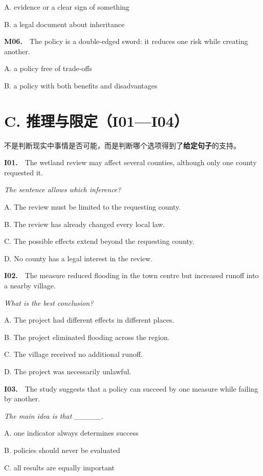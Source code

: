 \documentclass[a4paper,11pt,openany]{report}
\begin{document}
A. evidence or a clear sign of something

B. a legal document about inheritance

\textbf{M06.}　The policy is a double-edged sword: it reduces one risk while creating another.

A. a policy free of trade-offs

B. a policy with both benefits and disadvantages

\section{C. 推理与限定（I01---I04）}\label{c.-ux63a8ux7406ux4e0eux9650ux5b9ai01i04}

不是判断现实中事情是否可能，而是判断哪个选项得到了\textbf{给定句子}的支持。

\textbf{I01.}　The wetland review may affect several counties, although only one county requested it.

\emph{The sentence allows which inference?}

A. The review must be limited to the requesting county.

B. The review has already changed every local law.

C. The possible effects extend beyond the requesting county.

D. No county has a legal interest in the review.

\textbf{I02.}　The measure reduced flooding in the town centre but increased runoff into a nearby village.

\emph{What is the best conclusion?}

A. The project had different effects in different places.

B. The project eliminated flooding across the region.

C. The village received no additional runoff.

D. The project was necessarily unlawful.

\textbf{I03.}　The study suggests that a policy can succeed by one measure while failing by another.

\emph{The main idea is that \_\_\_\_\_.}

A. one indicator always determines success

B. policies should never be evaluated

C. all results are equally important
\end{document}
